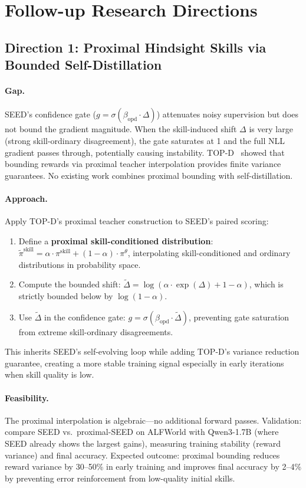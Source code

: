 \documentclass[11pt,a4paper]{article}
\begin{document}
\section{Follow-up Research Directions}

\subsection{Direction 1: Proximal Hindsight Skills via Bounded Self-Distillation}

\paragraph{Gap.} SEED's confidence gate ($g = \sigma(\beta_{\mathrm{opd}} \cdot \Delta)$) attenuates noisy supervision but does not bound the gradient magnitude. When the skill-induced shift $\Delta$ is very large (strong skill-ordinary disagreement), the gate saturates at 1 and the full NLL gradient passes through, potentially causing instability. TOP-D~\cite{topd2026} showed that bounding rewards via proximal teacher interpolation provides finite variance guarantees. No existing work combines proximal bounding with self-distillation.

\paragraph{Approach.} Apply TOP-D's proximal teacher construction to SEED's paired scoring:
\begin{enumerate}
\item Define a \textbf{proximal skill-conditioned distribution}: $\tilde{\pi}^{\mathrm{skill}} = \alpha \cdot \pi^{\mathrm{skill}} + (1-\alpha) \cdot \pi^{\theta}$, interpolating skill-conditioned and ordinary distributions in probability space.
\item Compute the bounded shift: $\tilde{\Delta} = \log(\alpha \cdot \exp(\Delta) + 1 - \alpha)$, which is strictly bounded below by $\log(1-\alpha)$.
\item Use $\tilde{\Delta}$ in the confidence gate: $g = \sigma(\beta_{\mathrm{opd}} \cdot \tilde{\Delta})$, preventing gate saturation from extreme skill-ordinary disagreements.
\end{enumerate}
This inherits SEED's self-evolving loop while adding TOP-D's variance reduction guarantee, creating a more stable training signal especially in early iterations when skill quality is low.

\paragraph{Feasibility.} The proximal interpolation is algebraic---no additional forward passes. Validation: compare SEED vs.\ proximal-SEED on ALFWorld with Qwen3-1.7B (where SEED already shows the largest gains), measuring training stability (reward variance) and final accuracy. Expected outcome: proximal bounding reduces reward variance by 30--50\% in early training and improves final accuracy by 2--4\% by preventing error reinforcement from low-quality initial skills.
\end{document}
